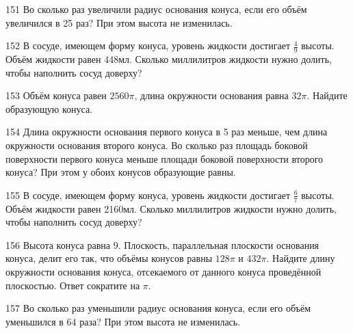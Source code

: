 \documentclass[a4paper]{article}
\begin{document}
\begin{taskBN}{151}
Во сколько раз увеличили радиус основания конуса, если его объём увеличился в 25 раз? При этом высота не изменилась.
\end{taskBN}

\begin{taskBN}{152}
В сосуде, имеющем форму конуса, уровень жидкости достигает $\frac{4}{9}$ высоты. Объём жидкости равен 448мл. Сколько миллилитров жидкости нужно долить, чтобы наполнить сосуд доверху?
\end{taskBN}

\begin{taskBN}{153}
Объём конуса равен $2560\pi$, длина окружности основания равна $32\pi$. Найдите образующую конуса. 
\end{taskBN}

\begin{taskBN}{154}
Длина окружности основания первого конуса в 5 раз меньше, чем длина окружности основания второго конуса. Во сколько раз площадь боковой поверхности первого конуса меньше площади боковой поверхности второго конуса? При этом у обоих конусов образующие равны.
\end{taskBN}

\begin{taskBN}{155}
В сосуде, имеющем форму конуса, уровень жидкости достигает $\frac{6}{7}$ высоты. Объём жидкости равен 2160мл. Сколько миллилитров жидкости нужно долить, чтобы наполнить сосуд доверху?
\end{taskBN}

\begin{taskBN}{156}
Высота конуса равна $9$. Плоскость, параллельная плоскости основания конуса,  делит его так, что объёмы конусов равны $128\pi$ и $432\pi$. Найдите длину окружности основания конуса, отсекаемого от данного конуса проведённой плоскостью. Ответ сократите на $\pi$.
\end{taskBN}

\begin{taskBN}{157}
Во сколько раз уменьшили радиус основания конуса, если его объём уменьшился в 64 раза? При этом высота не изменилась.
\end{taskBN}
\end{document}
